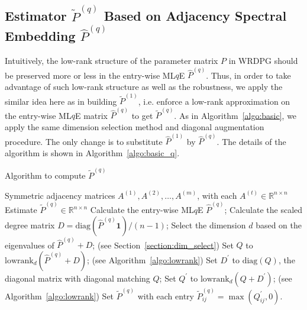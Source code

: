 \documentclass[a4paper]{article}
\renewcommand{\hat}{\widehat}
\begin{document}
\subsection{Estimator $\widetilde{P}^{(q)}$ Based on Adjacency Spectral Embedding $\hat{P}^{(q)}$}

Intuitively, the low-rank structure of the parameter matrix $P$ in WRDPG should be preserved more or less in the entry-wise ML$q$E $\hat{P}^{(q)}$. Thus, in order to take advantage of such low-rank structure as well as the robustness, we apply the similar idea here as in building $\widetilde{P}^{(1)}$, i.e. enforce a low-rank approximation on the entry-wise ML$q$E matrix $\hat{P}^{(q)}$ to get $\widetilde{P}^{(q)}$. As in Algorithm~\ref{algo:basic}, we apply the same dimension selection method and diagonal augmentation procedure. The only change is to substitute $\hat{P}^{(1)}$ by $\hat{P}^{(q)}$. The details of the algorithm is shown in Algorithm~\ref{algo:basic_q}.

\begin{algorithm}[H]
\caption{Algorithm to compute $\widetilde{P}^{(q)}$}
\label{algo:basic_q}
\begin{algorithmic}[1]
\REQUIRE Symmetric adjacency matrices $A^{(1)}, A^{(2)}, \dotsc, A^{(m)}$, with each $A^{(t)} \in \mathbb{R}^{n \times n}$
\ENSURE Estimate $\widetilde{P}^{(q)} \in \mathbb{R}^{n \times n}$
\STATE Calculate the entry-wise ML$q$E $\hat{P}^{(q)}$;
\STATE Calculate the scaled degree matrix $D = \mathrm{diag}(\hat{P}^{(q)} \bm{1})/(n-1)$;
\STATE Select the dimension $d$ based on the eigenvalues of $\hat{P}^{(q)} + D$; (see Section~\ref{section:dim_select})
\STATE Set $Q$ to $\mathrm{lowrank}_d(\hat{P}^{(q)} + D)$; (see Algorithm~\ref{algo:lowrank})
\STATE Set $D^{\prime}$ to $ \mathrm{diag}(Q)$, the diagonal matrix with diagonal matching $Q$; 
\STATE Set $Q^{\prime}$ to $\mathrm{lowrank}_d(Q + D^{\prime})$; (see Algorithm~\ref{algo:lowrank})
\STATE Set $\widetilde{P}^{(q)}$ with each entry $\widetilde{P}^{(q)}_{ij} = \max(Q^{\prime}_{ij}, 0)$.
\end{algorithmic}
\end{algorithm}

\end{document}
